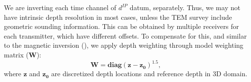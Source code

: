 \documentclass[a4paper, 11pt]{article}
\newcommand{\dip}{d^{IP}}
\begin{document}
We are inverting each time channel of $\dip$ datum, separately. Thus, we may not have intrinsic depth resolution in most cases, unless the TEM survey include geometric sounding information. This can be obtained by multiple receivers for each transmitter, which have different offsets. To compensate for this, and similar to the magnetic inversion (\cite{LiMag3D}), we apply depth weighting through model weighting matrix ($\mathbf{W}$):
\begin{equation}
    \mathbf{W} = \mathbf{diag}(\mathbf{z-z_0})^{1.5},
    \label{eq: weight_mat}
\end{equation}
where $\mathbf{z}$ and $\mathbf{z_0}$ are discretized depth locations and reference depth in 3D domain.

\end{document}
